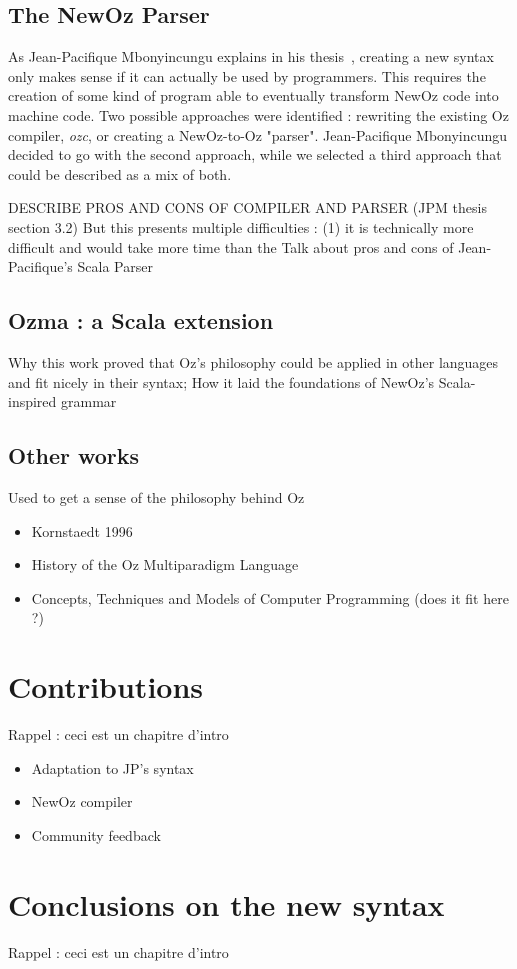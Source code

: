 \subsection{The NewOz Parser}\label{subsec:ch1-2-1}
As Jean-Pacifique Mbonyincungu explains in his thesis~\cite{jpthesis}, creating a new syntax only makes sense if it can actually be used by programmers.
This requires the creation of some kind of program able to eventually transform NewOz code into machine code.
Two possible approaches were identified : rewriting the existing Oz compiler, \textit{ozc}, or creating a NewOz-to-Oz "parser".
Jean-Pacifique Mbonyincungu decided to go with the second approach, while we selected a third approach that could be described as a mix of both.

DESCRIBE PROS AND CONS OF COMPILER AND PARSER (JPM thesis section 3.2)
But this presents multiple difficulties : (1) it is technically more difficult and would take more time than the
Talk about pros and cons of Jean-Pacifique's Scala Parser

\subsection{Ozma : a Scala extension}\label{subsec:ch1-2-2}
Why this work proved that Oz's philosophy could be applied in other languages and fit nicely in their syntax;
How it laid the foundations of NewOz's Scala-inspired grammar

\subsection{Other works}\label{subsec:ch1-2-3}
Used to get a sense of the philosophy behind Oz
\begin{itemize}
    \item Kornstaedt 1996
    \item History of the Oz Multiparadigm Language
    \item Concepts, Techniques and Models of Computer Programming (does it fit here ?)
\end{itemize}

\section{Contributions}\label{sec:ch1-3}
Rappel : ceci est un chapitre d'intro
\begin{itemize}
    \item Adaptation to JP's syntax
    \item NewOz compiler
    \item Community feedback
\end{itemize}

\section{Conclusions on the new syntax}\label{sec:ch1-4}
Rappel : ceci est un chapitre d'intro